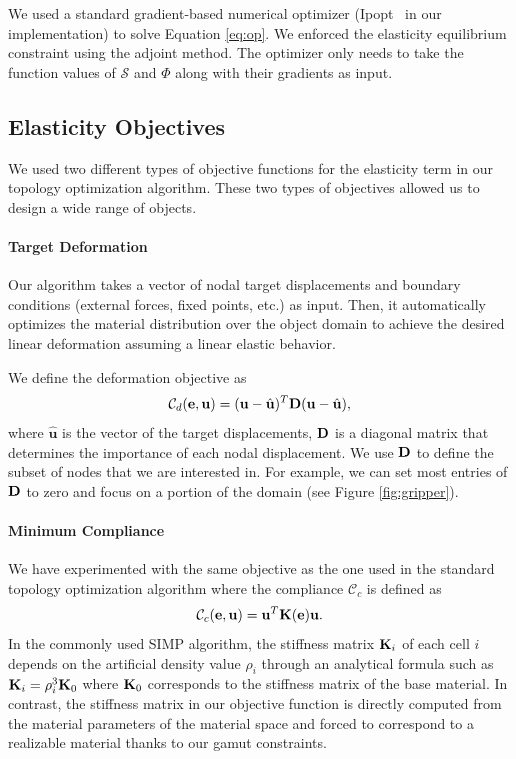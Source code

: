 We used a standard gradient-based numerical optimizer (Ipopt~\citep{ipopt} in our implementation) to solve Equation \ref{eq:op}. We enforced the elasticity equilibrium constraint using the adjoint method. The optimizer only needs to take the function values of $\mathcal{S}$ and $\Phi$ along with their gradients as input.

\subsection{Elasticity Objectives}\label{sec:obj}
We used two different types of objective functions for the elasticity term in our topology optimization algorithm. These two types of objectives allowed us to design a wide range of objects.
\paragraph*{Target Deformation}\label{sec:strain}
Our algorithm takes a vector of nodal target displacements and boundary conditions (external forces, fixed points, etc.) as input. Then, it automatically optimizes the material distribution over the object domain to achieve the desired linear deformation assuming a linear elastic behavior.

We define the deformation objective as
\begin{equation}
\mathcal{C}_d(\mathbf{e},\mathbf{u})=(\mathbf{u}-\hat{\mathbf{u}})^T \mathbf{D} (\mathbf{u}-\hat{\mathbf{u}}),\label{eq:td}
\end{equation}
where $\hat{\mathbf{u}}$ is the vector of the target displacements, $\bf D$ is a diagonal matrix that determines the importance of each nodal displacement.	
We use $\bf D$ to define the subset of nodes that we are interested in.
For example, we can set most entries of $\bf D$ to zero and focus on a portion of the domain (see Figure \ref{fig:gripper}).

\paragraph{Minimum Compliance}\label{sec:compliance}
We have experimented with the same objective as the one used in the standard topology optimization algorithm where the compliance $\mathcal{C}_c$ is defined as
\begin{equation}
\mathcal{C}_c(\mathbf{e},\mathbf{u})=\mathbf{u}^T \mathbf{K}(\mathbf{e}) \mathbf{u}.
\label{eq:mc}
\end{equation}
In the commonly used SIMP algorithm, the stiffness matrix $\mathbf{K}_i$ of each cell $i$ depends on the artificial density value $\rho_i$
through an analytical formula such as $\mathbf{K}_i = \rho_i^3\mathbf{K}_0$ where $\mathbf{K}_0$ corresponds to the stiffness matrix of the base material.
In contrast, the stiffness matrix in our objective function is directly computed from the material parameters of the material space and forced to correspond to a realizable material thanks to our gamut constraints.

